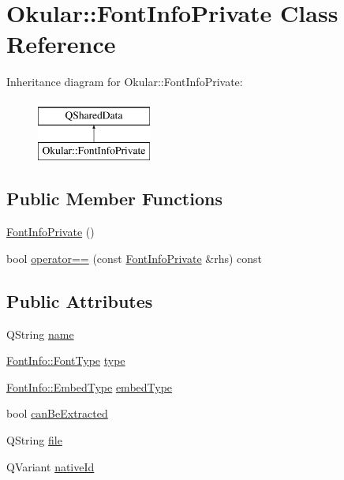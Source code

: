 \hypertarget{classOkular_1_1FontInfoPrivate}{\section{Okular\+:\+:Font\+Info\+Private Class Reference}
\label{classOkular_1_1FontInfoPrivate}
}
Inheritance diagram for Okular\+:\+:Font\+Info\+Private\+:\begin{figure}[H]
\begin{center}
\leavevmode
\includegraphics[height=2.000000cm]{classOkular_1_1FontInfoPrivate}
\end{center}
\end{figure}
\subsection*{Public Member Functions}
\begin{DoxyCompactItemize}
\item 
\hyperlink{classOkular_1_1FontInfoPrivate_a41c8f87f44c50a8a2735a2ed4c63795b}{Font\+Info\+Private} ()
\item 
bool \hyperlink{classOkular_1_1FontInfoPrivate_a1fc0d8e120f2014c55ea7957d1221e10}{operator==} (const \hyperlink{classOkular_1_1FontInfoPrivate}{Font\+Info\+Private} \&rhs) const 
\end{DoxyCompactItemize}
\subsection*{Public Attributes}
\begin{DoxyCompactItemize}
\item 
Q\+String \hyperlink{classOkular_1_1FontInfoPrivate_af602b6da5bbdb6c17071c03b07742ea6}{name}
\item 
\hyperlink{classOkular_1_1FontInfo_a9a7fc21a728ffa7296546c8a527e43f6}{Font\+Info\+::\+Font\+Type} \hyperlink{classOkular_1_1FontInfoPrivate_ae8a2de8a47a6241febd6fe850fc53e3e}{type}
\item 
\hyperlink{classOkular_1_1FontInfo_a549f8b2d829aead40f868ba5a6bf427f}{Font\+Info\+::\+Embed\+Type} \hyperlink{classOkular_1_1FontInfoPrivate_a0721f81e98ea14cf6e69385e69443076}{embed\+Type}
\item 
bool \hyperlink{classOkular_1_1FontInfoPrivate_a609a0c070f2e3df0bf7a52e813fbfa97}{can\+Be\+Extracted}
\item 
Q\+String \hyperlink{classOkular_1_1FontInfoPrivate_ab1e5c93ca5abb18a0c6684547897f2b1}{file}
\item 
Q\+Variant \hyperlink{classOkular_1_1FontInfoPrivate_aa3410ecfd4fc44d7fd0e7029d3f5f50f}{native\+Id}
\end{DoxyCompactItemize}


